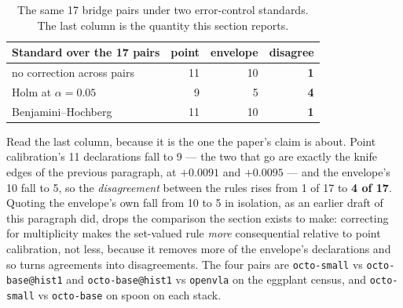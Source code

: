 \documentclass[pdflatex,iicol,sn-apa]{sn-jnl}
\theoremstyle{remark}
\begin{document}
\begin{table}[h]
\caption{The same 17 bridge pairs under two error-control standards. The last column is the
quantity this section reports.}\label{tab6b}
\begin{tabular}{@{}lrrr@{}}
\toprule
Standard over the 17 pairs & point & envelope & disagree \\
\midrule
no correction across pairs & 11 & 10 & \textbf{1} \\
Holm at $\alpha = 0.05$ & 9 & 5 & \textbf{4} \\
Benjamini--Hochberg & 11 & 10 & \textbf{1} \\
\bottomrule
\end{tabular}
\end{table}

\noindent Read the last column, because it is the one the paper's claim is about. Point
calibration's 11 declarations fall to 9 --- the two that go are exactly the knife edges of the
previous paragraph, at $+0.0091$ and $+0.0095$ --- and the envelope's 10 fall to 5, so the
\emph{disagreement} between the rules rises from 1 of 17 to \textbf{4 of 17}. Quoting the envelope's
own fall from 10 to 5 in isolation, as an earlier draft of this paragraph did, drops the comparison
the section exists to make: correcting for multiplicity makes the set-valued rule \emph{more}
consequential relative to point calibration, not less, because it removes more of the envelope's
declarations and so turns agreements into disagreements. The four pairs are
\texttt{octo-small} vs \texttt{octo-base@hist1} and \texttt{octo-base@hist1} vs \texttt{openvla} on
the eggplant census, and \texttt{octo-small} vs \texttt{octo-base} on spoon on each stack.
\end{document}
